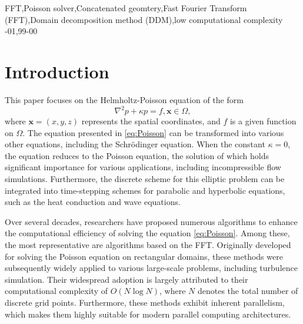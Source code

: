 \documentclass[preprint]{elsarticle}
\begin{document}
\begin{frontmatter}
\begin{keyword}
FFT\sep Poisson solver\sep Concatenated geomtery\sep Fast Fourier Transform (FFT)\sep Domain decomposition method (DDM)\sep low computational complexity
-01\sep  99-00
\end{keyword}

\end{frontmatter}

\linenumbers

\section{Introduction}
\label{sec:intro}


This paper focuses on the Helmholtz-Poisson equation of the form
\begin{equation}
    \label{eq:Poisson}
        \nabla^2p+\kappa p=f,\boldsymbol{x}\in\Omega,
\end{equation}
where $\boldsymbol{x}=\left(x,y,z\right)$ represents the spatial coordinates, and $f$ is a given function on $\Omega$. The equation presented in \eqref{eq:Poisson} can be transformed into various other equations, including the Schrödinger equation. When the constant $\kappa=0$, the equation reduces to the Poisson equation, the solution of which holds significant importance for various applications, including incompressible flow simulations. Furthermore, the discrete scheme for this elliptic problem can be integrated into time-stepping schemes for parabolic and hyperbolic equations, such as the heat conduction and wave equations.

Over several decades, researchers have proposed numerous algorithms to enhance the computational efficiency of solving the equation \eqref{eq:Poisson}. Among these, the most representative are algorithms based on the FFT\cite{jodra2017solving, cooley1965algorithm}. Originally developed for solving the Poisson equation on rectangular domains\cite{skollermo1975fourier}, these methods were subsequently widely applied to various large-scale problems, including turbulence simulation\cite{xie2021low, he2024turbulent}. Their widespread adoption is largely attributed to their computational complexity of $O\left(N \log N\right)$, where $N$ denotes the total number of discrete grid points. Furthermore, these methods exhibit inherent parallelism, which makes them highly suitable for modern parallel computing architectures.
\end{document}
